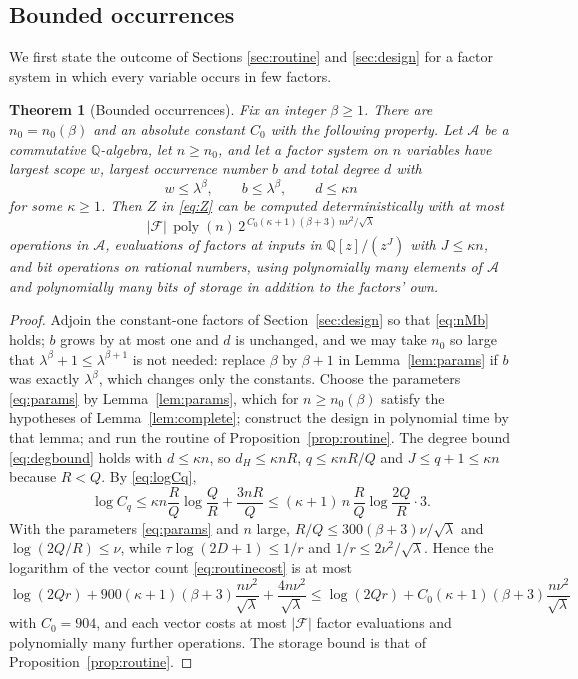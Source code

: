 \documentclass[11pt,reqno]{amsart}
\numberwithin{equation}{section}
\theoremstyle{plain}
\newtheorem{theorem}{Theorem}[section]
\theoremstyle{definition}
\theoremstyle{remark}
\DeclareMathOperator{\poly}{poly}
\newcommand{\A}{\mathcal{A}}
\newcommand{\F}{\mathcal{F}}
\newcommand{\Q}{\mathbb{Q}}
\begin{document}
\subsection{Bounded occurrences}
We first state the outcome of Sections \ref{sec:routine} and \ref{sec:design}
for a factor system in which every variable occurs in few factors.

\begin{theorem}[Bounded occurrences]\label{thm:bounded-occ}
Fix an integer $\beta\ge1$. There are $n_0=n_0(\beta)$ and an absolute constant
$C_0$ with the following property. Let $\A$ be a commutative $\Q$-algebra, let
$n\ge n_0$, and let a factor system on $n$ variables have largest scope $w$,
largest occurrence number $b$ and total degree $d$ with
\[
  w\le\lambda^{\beta},\qquad b\le\lambda^{\beta},\qquad d\le\kappa n
\]
for some $\kappa\ge1$. Then $Z$ in \eqref{eq:Z} can be computed deterministically
with at most
\begin{equation}\label{eq:boundedocc}
  |\F|\,\poly(n)\,2^{\,C_0(\kappa+1)(\beta+3)\,n\nu^2/\sqrt\lambda}
\end{equation}
operations in $\A$, evaluations of factors at inputs in $\Q[z]/(z^{J})$ with
$J\le\kappa n$, and bit operations on rational numbers, using polynomially many
elements of $\A$ and polynomially many bits of storage in addition to the
factors' own.
\end{theorem}

\begin{proof}
Adjoin the constant-one factors of Section~\ref{sec:design} so that
\eqref{eq:nMb} holds; $b$ grows by at most one and $d$ is unchanged, and we may
take $n_0$ so large that $\lambda^\beta+1\le\lambda^{\beta+1}$ is not needed:
replace $\beta$ by $\beta+1$ in Lemma~\ref{lem:params} if $b$ was exactly
$\lambda^\beta$, which changes only the constants. Choose the parameters
\eqref{eq:params} by Lemma~\ref{lem:params}, which for $n\ge n_0(\beta)$
satisfy the hypotheses of Lemma~\ref{lem:complete}; construct the design in
polynomial time by that lemma; and run the routine of
Proposition~\ref{prop:routine}. The degree bound \eqref{eq:degbound} holds with
$d\le\kappa n$, so $d_H\le\kappa nR$, $q\le\kappa nR/Q$ and $J\le q+1\le\kappa n$
because $R<Q$. By \eqref{eq:logCq},
\[
  \log C_q\le\kappa n\frac RQ\log\frac QR+\frac{3nR}{Q}
  \le(\kappa+1)\,n\,\frac{R}{Q}\log\frac{2Q}{R}\cdot 3 .
\]
With the parameters \eqref{eq:params} and $n$ large, $R/Q\le 300(\beta+3)\nu/\sqrt\lambda$
and $\log(2Q/R)\le\nu$, while $\tau\log(2D+1)\le 1/r$ and
$1/r\le 2\nu^2/\sqrt\lambda$. Hence the logarithm of the vector count
\eqref{eq:routinecost} is at most
\[
  \log(2Qr)+900(\kappa+1)(\beta+3)\frac{n\nu^2}{\sqrt\lambda}+\frac{4n\nu^2}{\sqrt\lambda}
  \le \log(2Qr)+C_0(\kappa+1)(\beta+3)\frac{n\nu^2}{\sqrt\lambda}
\]
with $C_0=904$, and each vector costs at most $|\F|$ factor evaluations and
polynomially many further operations. The storage bound is that of
Proposition~\ref{prop:routine}.
\end{proof}
\end{document}
